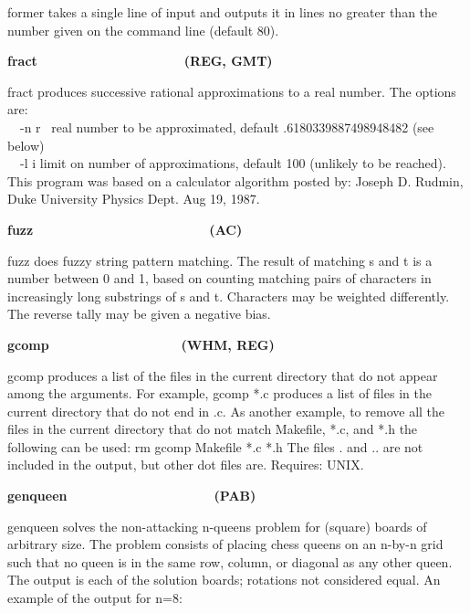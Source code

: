 {\textsf{former} takes a single line of input and outputs it in lines no
greater than the number given on the command line (default 80). 

{\sffamily\bfseries
fract\ \ \ \ \ \ \ \ \ \ \ \ \ \ \ \ \ \ \ \ (REG, GMT)}

\textsf{fract} produces successive rational approximations to a real
number. The options are:\\
\ \ \textsf{{}-n r} \ real number to be approximated, default
.6180339887498948482 (see below)\\
\ \ \textsf{{}-l i} limit on number of approximations, default 100
(unlikely to be reached).\\
This program was based on a calculator algorithm posted by: Joseph D.
Rudmin, Duke University Physics Dept. Aug 19, 1987.

{\sffamily\bfseries
fuzz\ \ \ \ \ \ \ \ \ \ \ \ \ \ \ \ \ \ \ \ \ \  \ \ (AC)}

\textsf{fuzz} does {\textquotedbl}fuzzy{\textquotedbl} string
pattern matching. The result of matching s and
t is a number between 0 and 1, based on counting matching pairs of
characters in increasingly long substrings of s and t. Characters may
be weighted differently. The reverse tally may be given a negative
bias.

{\sffamily\bfseries
gcomp\ \ \ \ \ \ \ \ \ \ \ \ \ \ \ \ \ \ (WHM, REG)}

\textsf{gcomp} produces a list of the files in the current directory
that do not appear among the arguments. For example, \textsf{gcomp *.c}
produces a list of files in the current directory that do not end in
.c. As another example, to remove all the files in the current
directory that do not match \textsf{Makefile}, \textsf{*.c}, and
\textsf{*.h} the following can be used: \textsf{rm
{\textasciigrave}gcomp Makefile *.c *.h{\textasciigrave}} The files
\textsf{.} and \textsf{..} are not included in the output, but other
{\textasciigrave}dot files{\textquotesingle} are. Requires: UNIX. 

{\sffamily\bfseries
genqueen\ \ \ \ \ \ \ \ \ \ \ \ \ \ \ \ \ \ \ \ (PAB)}

\textsf{genqueen} solves the non-attacking n-queens
problem for (square) boards of arbitrary size. The problem consists of
placing chess queens on an n-by-n grid such that no queen is in the
same row, column, or diagonal as any other queen. The output is each of
the solution boards; rotations not considered equal. An example of the
output for n=8:

}
